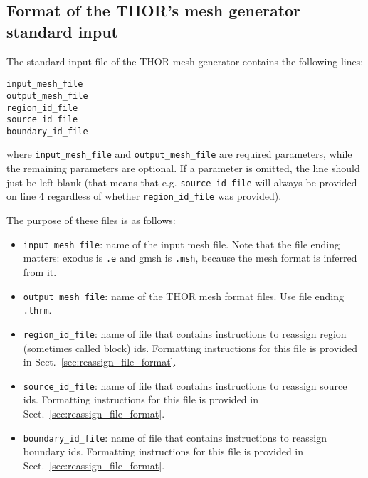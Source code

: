\subsection{Format of the THOR's mesh generator standard input}
The standard input file of the THOR mesh generator contains the following lines:
\begin{verbatim}
input_mesh_file
output_mesh_file
region_id_file
source_id_file
boundary_id_file
\end{verbatim}
where \verb"input_mesh_file" and \verb"output_mesh_file" are required parameters, while the remaining parameters are optional.
If a parameter is omitted, the line should just be left blank (that means that e.g. \verb"source_id_file" will always be provided
on line 4 regardless of whether \verb"region_id_file" was provided).

The purpose of these files is as follows:
\begin{itemize}
    \item \verb"input_mesh_file": name of the input mesh file. Note that the file ending matters: exodus is \verb".e" and gmsh is \verb".msh", because the mesh format is inferred from it.
    \item \verb"output_mesh_file": name of the THOR mesh format files. Use file ending \verb".thrm".
    \item  \verb"region_id_file": name of file that contains instructions to reassign region (sometimes called block) ids. Formatting instructions for this file is provided in Sect.~\ref{sec:reassign_file_format}.
    \item  \verb"source_id_file": name of file that contains instructions to reassign source ids. Formatting instructions for this file is provided in Sect.~\ref{sec:reassign_file_format}.
    \item  \verb"boundary_id_file": name of file that contains instructions to reassign boundary ids. Formatting instructions for this file is provided in Sect.~\ref{sec:reassign_file_format}.
\end{itemize}

